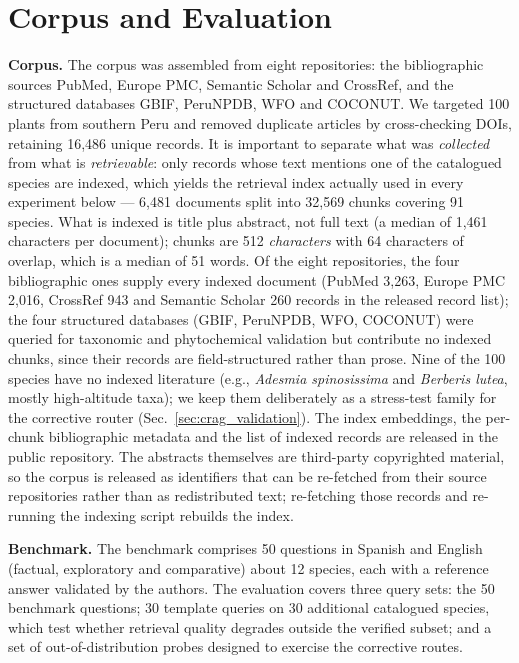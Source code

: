 \documentclass[runningheads]{llncs}
\begin{document}
\section{Corpus and Evaluation}
\label{sec:experiments}

\textbf{Corpus.} The corpus was assembled from eight repositories: the bibliographic sources PubMed, Europe PMC, Semantic Scholar and CrossRef, and the structured databases GBIF, PeruNPDB, WFO and COCONUT. We targeted 100 plants from southern Peru and removed duplicate articles by cross-checking DOIs, retaining 16,486 unique records. It is important to separate what was \emph{collected} from what is \emph{retrievable}: only records whose text mentions one of the catalogued species are indexed, which yields the retrieval index actually used in every experiment below --- 6,481 documents split into 32,569 chunks covering 91 species. What is indexed is title plus abstract, not full text (a median of 1,461 characters per document); chunks are 512 \emph{characters} with 64 characters of overlap, which is a median of 51 words. Of the eight repositories, the four bibliographic ones supply every indexed document (PubMed 3,263, Europe PMC 2,016, CrossRef 943 and Semantic Scholar 260 records in the released record list); the four structured databases (GBIF, PeruNPDB, WFO, COCONUT) were queried for taxonomic and phytochemical validation but contribute no indexed chunks, since their records are field-structured rather than prose. Nine of the 100 species have no indexed literature (e.g., \textit{Adesmia spinosissima} and \textit{Berberis lutea}, mostly high-altitude taxa); we keep them deliberately as a stress-test family for the corrective router (Sec.~\ref{sec:crag_validation}). The index embeddings, the per-chunk bibliographic metadata and the list of indexed records are released in the public repository. The abstracts themselves are third-party copyrighted material, so the corpus is released as identifiers that can be re-fetched from their source repositories rather than as redistributed text; re-fetching those records and re-running the indexing script rebuilds the index.

\textbf{Benchmark.} The benchmark comprises 50 questions in Spanish and English (factual, exploratory and comparative) about 12 species, each with a reference answer validated by the authors. The evaluation covers three query sets: the 50 benchmark questions; 30 template queries on 30 additional catalogued species, which test whether retrieval quality degrades outside the verified subset; and a set of out-of-distribution probes designed to exercise the corrective routes.
\end{document}
